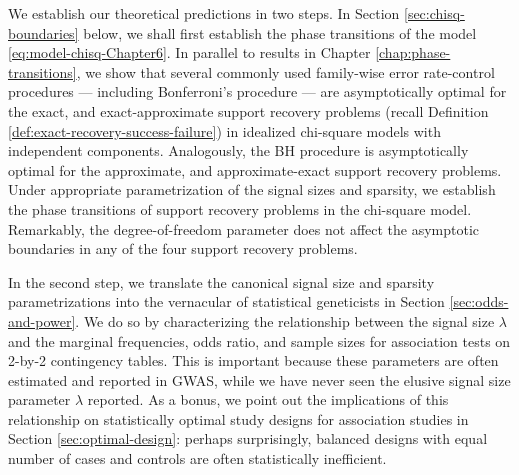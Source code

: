 We establish our theoretical predictions in two steps.
In Section \ref{sec:chisq-boundaries} below, we shall first establish the phase transitions of the model \eqref{eq:model-chisq-Chapter6}.
In parallel to results in Chapter \ref{chap:phase-transitions}, we show that several commonly used family-wise error rate-control procedures --- including Bonferroni's procedure --- are asymptotically optimal for the {exact}, and {exact-approximate} support recovery problems (recall Definition \ref{def:exact-recovery-success-failure}) in idealized chi-square models with independent components.
Analogously, the \ac{BH} procedure is asymptotically optimal for the {approximate}, and {approximate-exact} support recovery problems.
Under appropriate parametrization of the signal sizes and sparsity, we establish the phase transitions of support recovery problems in the chi-square model.
Remarkably, the degree-of-freedom parameter does not affect the asymptotic boundaries in any of the four support recovery problems.

In the second step, we translate the canonical signal size and sparsity parametrizations into the vernacular of statistical geneticists in Section \ref{sec:odds-and-power}.
We do so by characterizing the relationship between the signal size $\lambda$ and the marginal frequencies, odds ratio, and sample sizes for association tests on 2-by-2 contingency tables. 
This is important because these parameters are often estimated and reported in \ac{GWAS}, while we have never seen the elusive signal size parameter $\lambda$ reported.
As a bonus, we point out the implications of this relationship on statistically optimal study designs for association studies in Section \ref{sec:optimal-design}:
perhaps surprisingly, balanced designs with equal number of cases and controls are often statistically inefficient.

